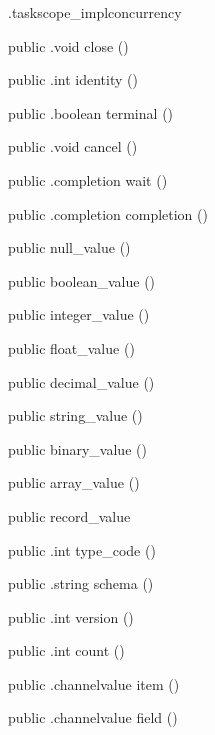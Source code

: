 \begin{CrexxClass}{.taskscope\_impl}{concurrency}
\begin{Members}
    \Method
      {public}
      {.void}
      {close}
      {()}

    \Method
      {public}
      {.int}
      {identity}
      {()}

    \Method
      {public}
      {.boolean}
      {terminal}
      {()}

    \Method
      {public}
      {.void}
      {cancel}
      {()}

    \Method
      {public}
      {.completion}
      {wait}
      {()}

    \Method
      {public}
      {.completion}
      {completion}
      {()}

    \Factory
      {public}
      {null\_value}
      {()}

    \Factory
      {public}
      {boolean\_value}
      {()}

    \Factory
      {public}
      {integer\_value}
      {()}

    \Factory
      {public}
      {float\_value}
      {()}

    \Factory
      {public}
      {decimal\_value}
      {()}

    \Factory
      {public}
      {string\_value}
      {()}

    \Factory
      {public}
      {binary\_value}
      {()}

    \Factory
      {public}
      {array\_value}
      {()}

    \Factory
      {public}
      {record\_value}
      {}

    \Method
      {public}
      {.int}
      {type\_code}
      {()}

    \Method
      {public}
      {.string}
      {schema}
      {()}

    \Method
      {public}
      {.int}
      {version}
      {()}

    \Method
      {public}
      {.int}
      {count}
      {()}

    \Method
      {public}
      {.channelvalue}
      {item}
      {()}

    \Method
      {public}
      {.channelvalue}
      {field}
      {()}


\end{Members}
\end{CrexxClass}
